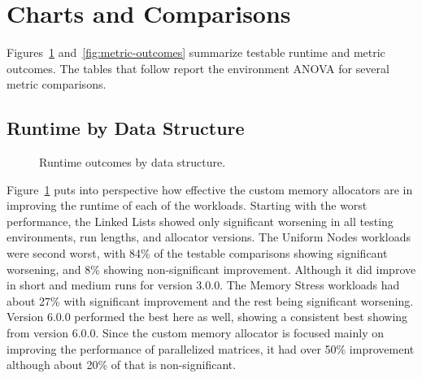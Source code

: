 \section{Charts and Comparisons}
\label{sec:charts-comparisons}

Figures~\ref{fig:runtime-outcomes} and~\ref{fig:metric-outcomes} summarize testable runtime and metric outcomes. The tables that follow report the environment ANOVA for several metric comparisons.
\subsection{Runtime by Data Structure}
\begin{figure}[H]
\centering
{}
\caption{Runtime outcomes by data structure.}
\label{fig:runtime-outcomes}
\end{figure}

Figure~\ref{fig:runtime-outcomes} puts into perspective how effective the custom memory allocators are in improving the runtime of each of the workloads. 
Starting with the worst performance, the Linked Lists showed only significant worsening in all testing environments, run lengths, and allocator versions.
The Uniform Nodes workloads were second worst, with 84\% of the testable comparisons showing significant worsening, and 8\% showing non-significant improvement. Although it did improve in short and medium runs for version 3.0.0.
The Memory Stress workloads had about 27\% with significant improvement and the rest being significant worsening. Version 6.0.0 performed the best here as well, showing a consistent best showing from version 6.0.0.
Since the custom memory allocator is focused mainly on improving the performance of parallelized matrices, it had over 50\% improvement although about 20\% of that is non-significant.

